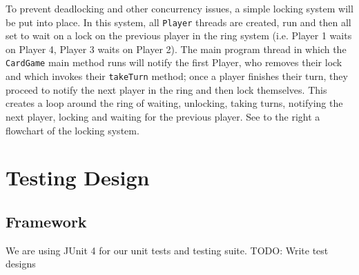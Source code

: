 \documentclass[a4paper, 11pt] {article}
\begin{document}
To prevent deadlocking and other concurrency issues, a simple locking system will be put into place. In this system, all \texttt{Player} threads are created, run and then all set to wait on a lock on the previous player in the ring system (i.e. Player 1 waits on Player 4, Player 3 waits on Player 2). The main program thread in which the \texttt{CardGame} main method runs will notify the first Player, who removes their lock and which invokes their \texttt{takeTurn} method; once a player finishes their turn, they proceed to notify the next player in the ring and then lock themselves. This creates a loop around the ring of waiting, unlocking, taking turns, notifying the next player, locking and waiting for the previous player. See to the right a flowchart of the locking system.


\pagebreak
\section*{Testing Design}
\subsection*{Framework}
We are using JUnit 4 for our unit tests and testing suite.
TODO: Write test designs
\end{document}
